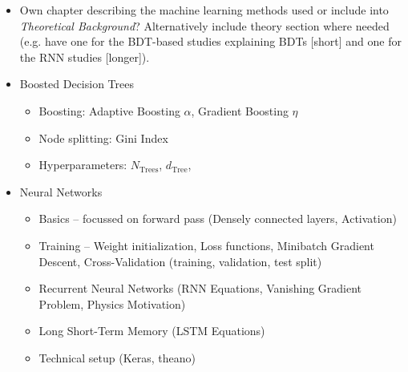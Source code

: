 \begin{itemize}
\item Own chapter describing the machine learning methods used or include into
  \textit{Theoretical Background}? Alternatively include theory section where
  needed (e.g. have one for the BDT-based studies explaining BDTs [short] and
  one for the RNN studies [longer]).

\item Boosted Decision Trees
  \begin{itemize}
  \item Boosting: Adaptive Boosting $\alpha$, Gradient Boosting $\eta$
  \item Node splitting: Gini Index
  \item Hyperparameters: $N_\mathrm{Trees}$, $d_\mathrm{Tree}$,
  \end{itemize}

\item Neural Networks
  \begin{itemize}
  \item Basics -- focussed on forward pass (Densely connected layers, Activation)
  \item Training -- Weight initialization, Loss functions, Minibatch Gradient
    Descent, Cross-Validation (training, validation, test split)
  \item Recurrent Neural Networks (RNN Equations, Vanishing Gradient Problem,
    Physics Motivation)
  \item Long Short-Term Memory \cite{lstm} (LSTM Equations)
  \item Technical setup (Keras, theano)
  \end{itemize}
\end{itemize}


